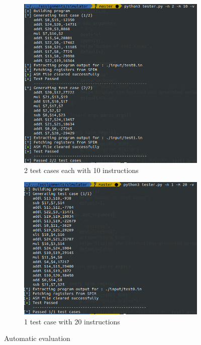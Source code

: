 \documentclass[hidelinks,12pt]{article}
\begin{document}
\begin{figure}[H]
    \centering
    \begin{subfigure}[t]{\textwidth}
        \centering
        \includegraphics[scale=0.4]{n2_m10.png}
        \caption{2 test cases each with 10 instructions}
    \end{subfigure}
    \begin{subfigure}[t]{\textwidth}
        \centering
        \includegraphics[scale=0.4]{n1_m20.png}
        \caption{1 test case with 20 instructions}
    \end{subfigure}
    \caption{Automatic evaluation}
\end{figure}
\end{document}

